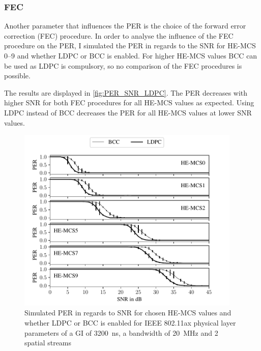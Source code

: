 \subsubsection*{\acf{FEC}}
Another parameter that influences the \ac{PER} is the choice of the forward error correction (FEC) procedure. In order to
analyse the influence of the FEC procedure on the \ac{PER}, I simulated the \ac{PER} in regards to the \ac{SNR} for HE-MCS
\numrange{0}{9} and whether \ac{LDPC} or \ac{BCC} is enabled. For higher HE-MCS values \ac{BCC} can be used as \ac{LDPC} is compulsory, so no comparison of the \ac{FEC} procedures is possible.

The results are displayed in \autoref{fig:PER_SNR_LDPC}. The \ac{PER} decreases with higher \ac{SNR} for both \ac{FEC} procedures for all HE-MCS values as
expected. Using \ac{LDPC} instead of \ac{BCC} decreases the \ac{PER} for all HE-MCS values at lower \ac{SNR} values.
\begin{figure}[H]%
	\centering
	\includegraphics[width=0.95\textwidth]{figures/LDPC_PER_to_SNR.pdf}
	\caption{Simulated \ac{PER} in regards to \ac{SNR} for chosen HE-\ac{MCS} values and whether \ac{LDPC} or \ac{BCC} is enabled for IEEE 802.11ax physical layer parameters of a \ac{GI} of \SI{3200}{\nano\second}, a bandwidth of \SI{20}{\mega\hertz} and 2 spatial streams}%
	\label{fig:PER_SNR_LDPC}%
\end{figure}

